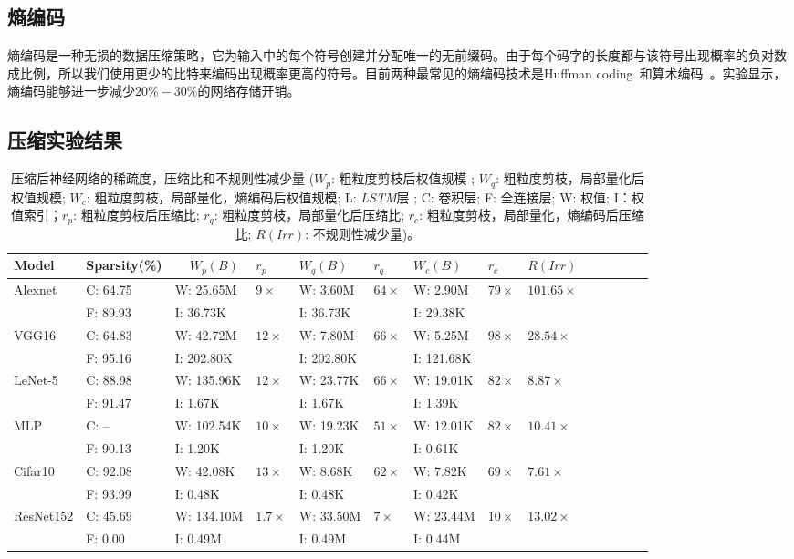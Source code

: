 \subsection{熵编码}
熵编码是一种无损的数据压缩策略，它为输入中的每个符号创建并分配唯一的无前缀码。由于每个码字的长度都与该符号出现概率的负对数成比例，所以我们使用更少的比特来编码出现概率更高的符号。目前两种最常见的熵编码技术是Huffman coding~\cite{huffman1952method}和算术编码~\cite{witten1987arithmetic}。实验显示，熵编码能够进一步减少$20\% - 30\%$的网络存储开销。

\subsection{压缩实验结果}
\begin{table}[h]
\centering
\caption{压缩后神经网络的稀疏度，压缩比和不规则性减少量 ($W_p$: 粗粒度剪枝后权值规模 ; $W_q$: 粗粒度剪枝，局部量化后权值规模; $W_c$: 粗粒度剪枝，局部量化，熵编码后权值规模; L: \emph{LSTM}层 ; C: 卷积层; F: 全连接层; W: 权值; I：权值索引；$r_p$: 粗粒度剪枝后压缩比; $r_q$: 粗粒度剪枝，局部量化后压缩比; $r_c$: 粗粒度剪枝，局部量化，熵编码后压缩比; $R(Irr)$: 不规则性减少量)。}
\label{tab:compression}
\begin{tabular}{@{}l@{~}l@{\!\!}l@{~}l@{\,}l@{~}l@{\,}l@{}l@{~}l@{~}l@{~}l@{~}lll}
\toprule
Model		&\!\!\!Sparsity(\%) & ~~$W_p(B)$ 	& $r_p$ 	& $W_q(B)$ 		& $r_q$ 		& $W_c(B)$ 		& $r_c$			& $R(Irr)$ 				\\
\midrule
Alexnet 	& C: 64.75\ 		&W: 25.65M  &$9\times$   &W: 3.60M 		& $64\times$ 	& W: 2.90M		& $79\times$	& $101.65\times$	 				\\
  			& F: 89.93\ 		&I: 36.73K  &  			 &I: 36.73K 	&  	 			& I: 29.38K 	& 				&		\\
VGG16 		& C: 64.83\ 		&W: 42.72M  &$12\times$  &W: 7.80M		& $66\times$ 	& W: 5.25M 		& $98\times$	& $28.54\times$  	 				\\
  			& F: 95.16\  		&I: 202.80K &			 &I: 202.80K 	&  	  			& I: 121.68K	& 	  	 		&			\\
LeNet-5 		& C: 88.98\ 		&W: 135.96K &$12\times$  &W: 23.77K 	& $66\times$  	& W: 19.01K		& $82\times$	& $8.87\times$ 	 				\\
  			& F: 91.47\  		&I: 1.67K   &			 &I: 1.67K		&  	   			& I: 1.39K 						& \\
MLP 		& C: --				&W: 102.54K &$10\times$  &W: 19.23K 	& $51\times$  	& W: 12.01K 	& $82\times$ 	& $10.41\times$				\\
  			& F: 90.13\  		&I: 1.20K   &			 &I: 1.20K		&  				& I: 0.61K	 	&  				& 		\\
Cifar10 	& C: 92.08\			&W: 42.08K  &$13\times$	 &W: 8.68K 		& $62\times$   	& W: 7.82K		& $69\times$ 	& $7.61\times$			\\
  			& F: 93.99\  		&I: 0.48K   &			 &I: 0.48K		&  		       	& I: 0.42K  	&				& \\
ResNet152 	& C: 45.69\			&W: 134.10M &$1.7\times$ &W: 33.50M		& $7\times$  	& W: 23.44M		& $10\times$ 	& $13.02\times$					\\
  		    & F: 0.00\ 		    &I: 0.49M   &			 &I: 0.49M		&				&  I: 0.44M		&	 			& \\


\end{tabular}
\end{table}
